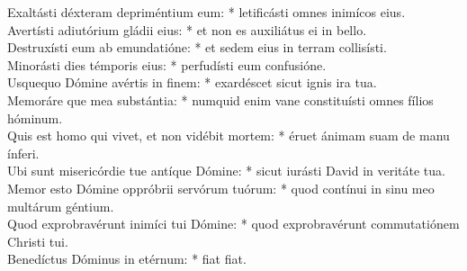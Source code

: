 {	Exaltásti déxteram depriméntium eum: * letificásti omnes inimícos eius. \\
	Avertísti adiutórium gládii eius: * et non es auxiliátus ei in bello. \\
	Destruxísti eum ab emundatióne: * et sedem eius in terram collisísti. \\
	Minorásti dies témporis eius: * perfudísti eum confusióne. \\
	Usquequo Dómine avértis in finem: * exardéscet sicut ignis ira tua. \\
	Memoráre que mea substántia: * numquid enim vane constituísti omnes fílios hóminum. \\
	Quis est homo qui vivet, et non vidébit mortem: * éruet ánimam suam de manu ínferi. \\
	Ubi sunt misericórdie tue antíque Dómine: * sicut iurásti David in veritáte tua. \\
	Memor esto Dómine oppróbrii servórum tuórum: * quod contínui in sinu meo multárum géntium. \\
	Quod exprobravérunt inimíci tui Dómine: * quod exprobravérunt commutatiónem Christi tui. \\
	Benedíctus Dóminus in etérnum: * fiat fiat.
}

